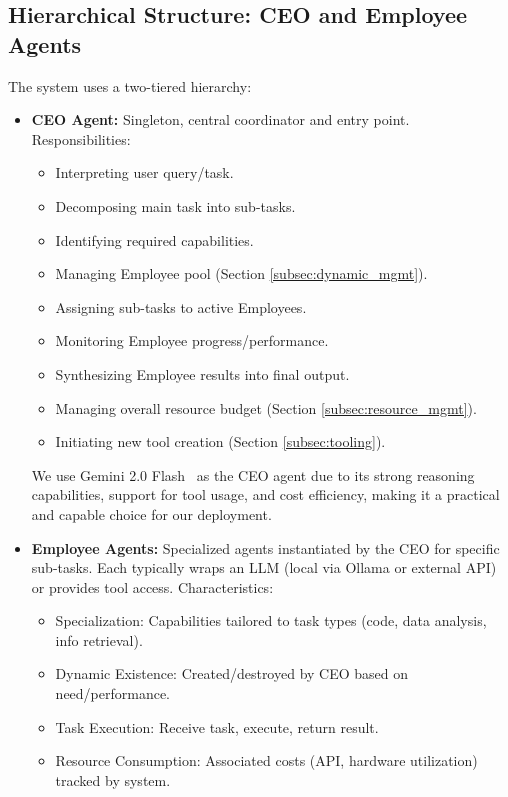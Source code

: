 \documentclass[conference]{IEEEtran}
\begin{document}
\subsection{Hierarchical Structure: CEO and Employee Agents}
The system uses a two-tiered hierarchy:

\begin{itemize}
    \item \textbf{CEO Agent:} Singleton, central coordinator and entry point. Responsibilities:
        \begin{itemize}
            \item Interpreting user query/task.
            \item Decomposing main task into sub-tasks.
            \item Identifying required capabilities.
            \item Managing Employee pool (Section \ref{subsec:dynamic_mgmt}).
            \item Assigning sub-tasks to active Employees.
            \item Monitoring Employee progress/performance.
            \item Synthesizing Employee results into final output.
            \item Managing overall resource budget (Section \ref{subsec:resource_mgmt}).
            \item Initiating new tool creation (Section \ref{subsec:tooling}).
        \end{itemize}
        We use Gemini 2.0 Flash~\cite{gemini20flash} as the CEO agent due to its strong reasoning capabilities, support for tool usage, and cost efficiency, making it a practical and capable choice for our deployment. 
    \item \textbf{Employee Agents:} Specialized agents instantiated by the CEO for specific sub-tasks. Each typically wraps an LLM (local via Ollama \cite{ollama} or external API) or provides tool access. Characteristics:
        \begin{itemize}
            \item Specialization: Capabilities tailored to task types (code, data analysis, info retrieval).
            \item Dynamic Existence: Created/destroyed by CEO based on need/performance.
            \item Task Execution: Receive task, execute, return result.
            \item Resource Consumption: Associated costs (API, hardware utilization) tracked by system.

\end{itemize}
\end{itemize}
\end{document}
